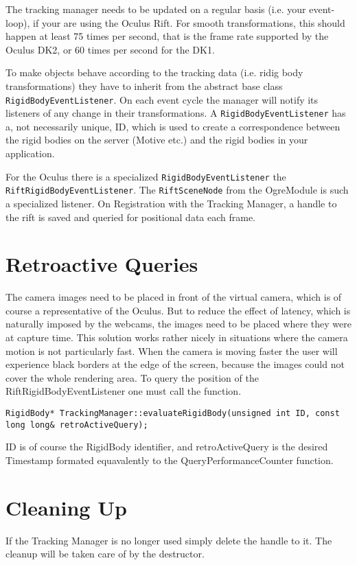 The tracking manager needs to be updated on a regular basis (i.e. your event-loop), if your are using the Oculus Rift. For smooth transformations, this should happen at least 75 times per second, that is the frame rate supported by the Oculus DK2, or 60 times per second for the DK1.

To make objects behave according to the tracking data (i.e. ridig body transformations) they have to inherit from the abstract base class \texttt{RigidBodyEventListener}. On each event cycle the manager will notify its listeners of any change in their transformations. A \texttt{RigidBodyEventListener} has a, not necessarily unique, ID, which is used to create a correspondence between the rigid bodies on the server (Motive etc.) and the rigid bodies in your application.

For the Oculus there is a specialized \texttt{RigidBodyEventListener} the \texttt{\justify RiftRigidBodyEventListener}. The \texttt{RiftSceneNode} from the OgreModule is such a specialized listener. On Registration with the Tracking Manager, a handle to the rift is saved and queried for positional data each frame.


\section{Retroactive Queries}\label{retroactive-queries}

The camera images need to be placed in front of the virtual camera, which is of course a representative of the Oculus. But to reduce the effect of latency, which is naturally imposed by the webcams, the images need to be placed where they were at capture time. This solution works rather nicely in situations where the camera motion is not particularly fast. When the camera is moving faster the user will experience black borders at the edge of the screen, because the images could not cover the whole rendering area. To query the position of the RiftRigidBodyEventListener one must call the function.

\begin{lstlisting}
RigidBody* TrackingManager::evaluateRigidBody(unsigned int ID, const long long& retroActiveQuery);
\end{lstlisting}

ID is of course the RigidBody identifier, and retroActiveQuery is the desired Timestamp formated equavalently to the QueryPerformanceCounter function.

\section{Cleaning Up}\label{cleaning-up}

If the Tracking Manager is no longer used simply delete the handle to it. The cleanup will be taken care of by the destructor.
